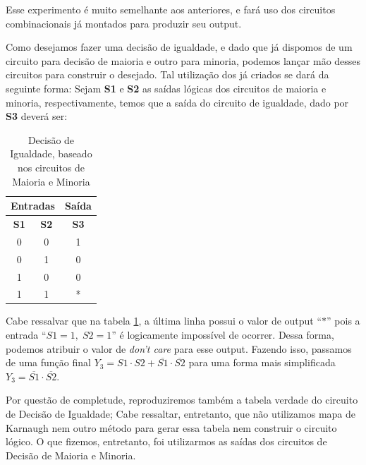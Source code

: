 \documentclass[12pt]{article}
\begin{document}
Esse experimento é muito semelhante aos anteriores, e fará uso dos circuitos
combinacionais já montados para produzir seu output.

Como desejamos fazer uma decisão de igualdade, e dado que já dispomos de um
circuito para decisão de maioria e outro para minoria, podemos lançar mão desses
circuitos para construir o desejado. Tal utilização dos já criados se dará da
seguinte forma: Sejam \textbf{S1} e \textbf{S2} as saídas lógicas dos circuitos
de maioria e minoria, respectivamente, temos que a saída do circuito de
igualdade, dado por \textbf{S3} deverá ser:

\begin{table}[H]
    \centering
    \caption{Decisão de Igualdade, baseado nos circuitos de Maioria e Minoria}
    \begin{tabular}{|c|c|c|}\hline
    \multicolumn{2}{|c|}{Entradas} & \multicolumn{1}{|c|}{Saída} \\\hline
    \textbf{S1} & \textbf{S2} & \textbf{S3} \\\hline
    0 & 0 & 1 \\\hline
    0 & 1 & 0 \\\hline
    1 & 0 & 0 \\\hline
    1 & 1 & * \\\hline
    \end{tabular}\label{tab:decisao_igualdade}
\end{table}

Cabe ressalvar que na tabela \ref{tab:decisao_igualdade}, a última linha possui
o valor de output ``\(*\)'' pois a entrada ``\(S1 = 1, \; S2 = 1\)'' é
logicamente impossível de ocorrer. Dessa forma, podemos atribuir o valor de
\emph{don't care} para esse output. Fazendo isso, passamos de uma função final
\(Y_{3} = S1 \cdot S2 + \overline{S1} \cdot \overline{S2}\) para uma forma mais
simplificada \(Y_{3} = \overline{S1} \cdot \overline{S2} \).

Por questão de completude, reproduziremos também a tabela verdade do circuito de
Decisão de Igualdade; Cabe ressaltar, entretanto, que não utilizamos mapa de
Karnaugh nem outro método para gerar essa tabela nem construir o circuito
lógico. O que fizemos, entretanto, foi utilizarmos as saídas dos circuitos de
Decisão de Maioria e Minoria.
\end{document}
